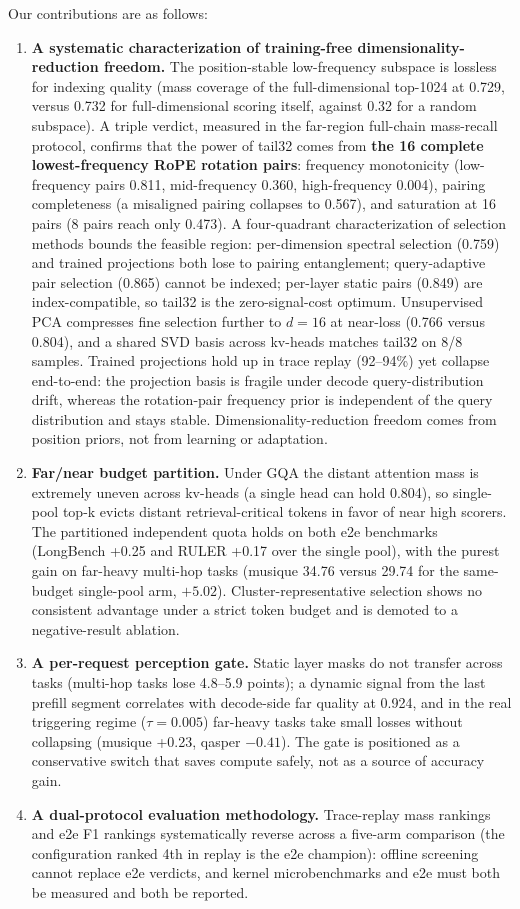 \documentclass[11pt]{article}
\begin{document}
Our contributions are as follows:
\begin{enumerate}
\item \textbf{A systematic characterization of training-free dimensionality-reduction freedom.} The position-stable low-frequency subspace is lossless for indexing quality (mass coverage of the full-dimensional top-1024 at 0.729, versus 0.732 for full-dimensional scoring itself, against 0.32 for a random subspace). A triple verdict, measured in the far-region full-chain mass-recall protocol, confirms that the power of tail32 comes from \textbf{the 16 complete lowest-frequency RoPE rotation pairs}: frequency monotonicity (low-frequency pairs 0.811, mid-frequency 0.360, high-frequency 0.004), pairing completeness (a misaligned pairing collapses to 0.567), and saturation at 16 pairs (8 pairs reach only 0.473). A four-quadrant characterization of selection methods bounds the feasible region: per-dimension spectral selection (0.759) and trained projections both lose to pairing entanglement; query-adaptive pair selection (0.865) cannot be indexed; per-layer static pairs (0.849) are index-compatible, so tail32 is the zero-signal-cost optimum. Unsupervised PCA compresses fine selection further to $d{=}16$ at near-loss (0.766 versus 0.804), and a shared SVD basis across kv-heads matches tail32 on 8/8 samples. Trained projections hold up in trace replay (92--94\%) yet collapse end-to-end: the projection basis is fragile under decode query-distribution drift, whereas the rotation-pair frequency prior is independent of the query distribution and stays stable. Dimensionality-reduction freedom comes from position priors, not from learning or adaptation.
\item \textbf{Far/near budget partition.} Under GQA the distant attention mass is extremely uneven across kv-heads (a single head can hold 0.804), so single-pool top-k evicts distant retrieval-critical tokens in favor of near high scorers. The partitioned independent quota holds on both e2e benchmarks (LongBench +0.25 and RULER +0.17 over the single pool), with the purest gain on far-heavy multi-hop tasks (musique 34.76 versus 29.74 for the same-budget single-pool arm, $+5.02$). Cluster-representative selection shows no consistent advantage under a strict token budget and is demoted to a negative-result ablation.
\item \textbf{A per-request perception gate.} Static layer masks do not transfer across tasks (multi-hop tasks lose 4.8--5.9 points); a dynamic signal from the last prefill segment correlates with decode-side far quality at 0.924, and in the real triggering regime ($\tau{=}0.005$) far-heavy tasks take small losses without collapsing (musique +0.23, qasper $-0.41$). The gate is positioned as a conservative switch that saves compute safely, not as a source of accuracy gain.
\item \textbf{A dual-protocol evaluation methodology.} Trace-replay mass rankings and e2e F1 rankings systematically reverse across a five-arm comparison (the configuration ranked 4th in replay is the e2e champion): offline screening cannot replace e2e verdicts, and kernel microbenchmarks and e2e must both be measured and both be reported.
\end{enumerate}
\end{document}

